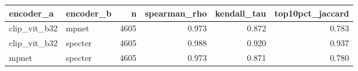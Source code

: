 \begin{tabular}{llrrrr}
\toprule
encoder\_a & encoder\_b & n & spearman\_rho & kendall\_tau & top10pct\_jaccard \\
\midrule
clip\_vit\_b32 & mpnet & 4605 & 0.973 & 0.872 & 0.783 \\
clip\_vit\_b32 & specter & 4605 & 0.988 & 0.920 & 0.937 \\
mpnet & specter & 4605 & 0.973 & 0.871 & 0.780 \\
\bottomrule
\end{tabular}
